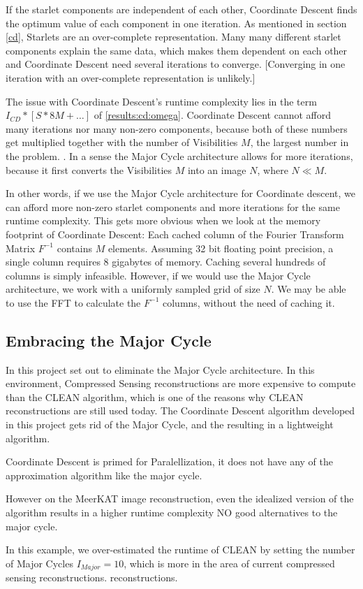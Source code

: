 If the starlet components are independent of each other, Coordinate Descent finds the optimum value of each component in one iteration. As mentioned in section \ref{cd}, Starlets are an over-complete representation. Many many different starlet components explain the same data, which makes them dependent on each other and Coordinate Descent need several iterations to converge. [Converging in one iteration with an over-complete representation is unlikely.]

The issue with Coordinate Descent's runtime complexity lies in the term $ I_{CD} * [S * 8M +\ldots]$ of \eqref{results:cd:omega}. Coordinate Descent cannot afford many iterations nor many non-zero components, because both of these numbers get multiplied together with the number of Visibilities $M$, the largest number in the problem. . In a sense the Major Cycle architecture allows for more iterations, because it first converts the Visibilities $M$ into an image $N$, where $N \ll M$.

In other words, if we use the Major Cycle architecture for Coordinate descent, we can afford more non-zero starlet components and more iterations for the same runtime complexity. This gets more obvious when we look at the memory footprint of Coordinate Descent: Each cached column of the Fourier Transform Matrix $F^{-1}$ contains $M$ elements. Assuming 32 bit floating point precision, a single column requires 8 gigabytes of memory. Caching several hundreds of columns is simply infeasible. However, if we would use the Major Cycle architecture, we work with a uniformly sampled grid of size $N$. We may be able to use the FFT to calculate the $F^{-1}$ columns, without the need of caching it.

\subsection{Embracing the Major Cycle}
In this project set out to eliminate the Major Cycle architecture. In this environment, Compressed Sensing reconstructions are more expensive to compute than the CLEAN algorithm, which is one of the reasons why CLEAN reconstructions are still used today. The Coordinate Descent algorithm developed in this project gets rid of the Major Cycle, and the resulting in a lightweight algorithm. 

Coordinate Descent is primed for Paralellization, it does not have any of the approximation algorithm like the major cycle.

However on the MeerKAT image reconstruction, even the idealized version of the algorithm results in a higher runtime complexity
NO good alternatives to the major cycle.


In this example, we over-estimated the runtime of CLEAN by setting the number of Major Cycles $I_{Major} = 10$, which is more in the area of current compressed sensing reconstructions. reconstructions. 

